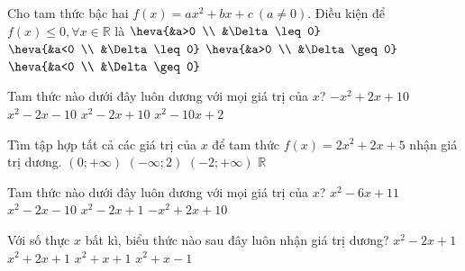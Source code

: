 \begin{ex}%
	Cho tam thức bậc hai $f(x)=ax^2+bx+c \ (a \neq 0)$. Điều kiện để $f(x)  \leq 0, \forall x \in \mathbb{R}$ là
	 \choice
		{$\heva{&a>0  \\ &\Delta \leq 0}$}
		{\True $\heva{&a<0 \\  &\Delta \leq 0}$}
		{$\heva{&a>0  \\ &\Delta \geq 0}$}
		{$\heva{&a<0 \\ &\Delta  \geq 0}$}
\end{ex}

\begin{ex}%
	Tam thức nào dưới đây luôn dương  với mọi giá trị của $x$?
	\choice 
		 {$-x^2+2x+10$}
		 {$x^2-2x-10$}
		{\True  $x^2-2x+10$}
		{$x^2-10x+2$} 
\end{ex}

\begin{ex}%
	Tìm tập hợp tất cả các giá trị  của $x$ để tam thức $f(x)=2x^2+2x+5$ nhận giá trị dương.
	 \choice
		{$(0; +\infty)$} 
		{$(-\infty;2)$} 
		{$(-2; +\infty)$} 
		{\True $\mathbb{R}$} 
\end{ex}

\begin{ex}%
	 Tam thức nào dưới đây luôn dương với mọi giá trị của $x$?
	 \choice
		 {\True $x^2-6x+11$}
		 {$x^2-2x-10$}
		 {$x^2-2x+1$}
		 {$-x^2+2x+10$}
\end{ex}

\begin{ex}%
	Với số thực $x$ bất kì, biểu thức nào sau đây luôn nhận giá  trị dương?
	\choice 
		{$x^2-2x+1$} 
		{$x^2+2x+1$} 
		 {\True $x^2+x+1$}
		 {$x^2+x-1$}
\end{ex}

